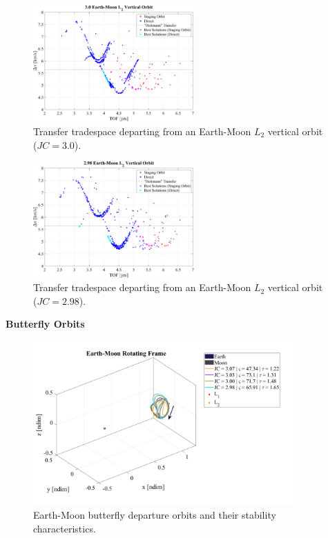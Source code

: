 \begin{figure}[ht]
    \centering
    \includegraphics[width=0.55\textwidth]{figures/TradeSpace_L2Vertical_3_00.pdf}
    \caption{Transfer tradespace departing from an Earth-Moon $L_{2}$ vertical orbit ($JC=3.0$).}
\end{figure}
\clearpage

\begin{figure}[ht]
    \centering
    \includegraphics[width=0.55\textwidth]{figures/TradeSpace_L2Vertical_2_98.pdf}
    \caption{Transfer tradespace departing from an Earth-Moon $L_{2}$ vertical orbit ($JC=2.98$).}
\end{figure}
\clearpage

\textbf{Butterfly Orbits}
\begin{figure}[ht]
    \centering
    \includegraphics[width=0.9\textwidth]{figures/ButterflyDepartureOrbits.pdf}
    \caption{Earth-Moon butterfly departure orbits and their stability characteristics.}
\end{figure}
\clearpage

